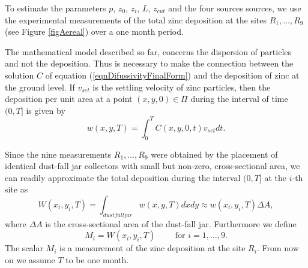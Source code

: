 \documentclass{sfuthesis}
\begin{document}
To estimate the parameters $p$, $z_{0}$, $z_{i}$, $L$, $z_{cut}$  and  the four sources sources, we use the  experimental measurements 
of the total zinc deposition at the sites 
$R_{1},\ldots,R_{9}$ (see Figure \ref{figAereal}) over a one month period. 

The mathematical model described so far,
concerns the dispersion of particles and not the deposition. 
Thus is necessary to make the connection between the solution $C$ of equation (\ref{eqnDifussivityFinalForm})
and the deposition of zinc at the ground level. If $v_{set}$ is the settling velocity of zinc particles,
then the deposition per unit area at a point $(x,y,0)\in\Pi$ during the interval of time $(0,T]$ is given by
\begin{equation}\label{eqnw}
w(x,y,T)=\int_{0}^{T}C(x,y,0,t)v_{set}dt.
\end{equation}

Since the nine measurements $R_{1},\ldots,R_{9}$ were obtained by the placement of identical dust-fall jar collectors with small but non-zero,
cross-sectional area,
we can readily approximate the total deposition during the interval $(0,T]$ at the $i$-th site as
\begin{equation*}
W(x_{i},y_{i},T)=\int_{dustfall jar}w(x,y,T)dxdy\approx w(x_{i},y_{i},T)\Delta A,
\end{equation*}
where $\Delta A$ is the cross-sectional area of the dust-fall jar. Furthermore we define
\begin{equation}\label{eqnW}
M_{i}=W(x_{i},y_{i},T)\qquad\text{ for }i=1,\ldots,9.
\end{equation}
The scalar $M_{i}$ is a measurement of the  zinc deposition at the site $R_{i}$. From now on we assume $T$ to 
be one month. 
\end{document}
